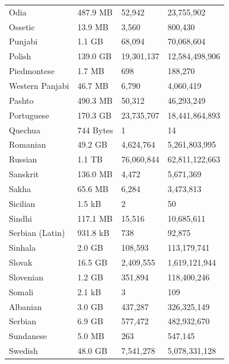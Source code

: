 \begin{table}[t!]
\begin{tabular}{llll}
        Odia              & 487.9 MB  & 52,942     & 23,755,902     \\
        Ossetic           & 13.9 MB   & 3,560      & 800,430        \\
        Punjabi           & 1.1 GB    & 68,094     & 70,068,604     \\
        Polish            & 139.0 GB  & 19,301,137 & 12,584,498,906 \\
        Piedmontese       & 1.7 MB    & 698        & 188,270        \\
        Western Panjabi   & 46.7 MB   & 6,790      & 4,060,419      \\
        Pashto            & 490.3 MB  & 50,312     & 46,293,249     \\
        Portuguese        & 170.3 GB  & 23,735,707 & 18,441,864,893 \\
        Quechua           & 744 Bytes & 1          & 14             \\
        Romanian          & 49.2 GB   & 4,624,764  & 5,261,803,995  \\
        Russian           & 1.1 TB    & 76,060,844 & 62,811,122,663 \\
        Sanskrit          & 136.0 MB  & 4,472      & 5,671,369      \\
        Sakha             & 65.6 MB   & 6,284      & 3,473,813      \\
        Sicilian          & 1.5 kB    & 2          & 50             \\
        Sindhi            & 117.1 MB  & 15,516     & 10,685,611     \\
        Serbian (Latin)   & 931.8 kB  & 738        & 92,875         \\
        Sinhala           & 2.0 GB    & 108,593    & 113,179,741    \\
        Slovak            & 16.5 GB   & 2,409,555  & 1,619,121,944  \\
        Slovenian         & 1.2 GB    & 351,894    & 118,400,246    \\
        Somali            & 2.1 kB    & 3          & 109            \\
        Albanian          & 3.0 GB    & 437,287    & 326,325,149    \\
        Serbian           & 6.9 GB    & 577,472    & 482,932,670    \\
        Sundanese         & 5.0 MB    & 263        & 547,145        \\
        Swedish           & 48.0 GB   & 7,541,278  & 5,078,331,128  \\

\end{tabular}
\end{table}
